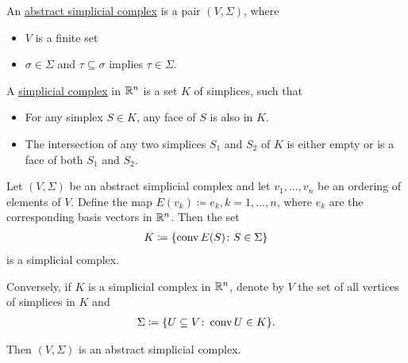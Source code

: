 \begin{definition}\label{def:abstract_simplicial_complex}\cite[definition 2.1]{Carlsson2009}
  An \uline{abstract simplicial complex} is a pair $(V, \Sigma)$, where
  \begin{itemize}
    \item $V$ is a finite set
    \item $\sigma \in \Sigma$ and $\tau \subseteq \sigma$ implies $\tau \in \Sigma$.
  \end{itemize}
\end{definition}

\begin{definition}\label{def:simplicial_complex}
  A \uline{simplicial complex} in $\mathbb R^n$ is a set $K$ of simplices, such that
  \begin{itemize}
    \item For any simplex $S \in K$, any face of $S$ is also in $K$.
    \item The intersection of any two simplices $S_1$ and $S_2$ of $K$ is either empty or is a face of both $S_1$ and $S_2$.
  \end{itemize}
\end{definition}

\begin{proposition}\label{thm:abstract_simplicial_complex_iff_simplicial_complex}
  Let $(V, \Sigma)$ be an abstract simplicial complex and let $v_1, \ldots, v_n$ be an ordering of elements of $V$. Define the map $E(v_k) \coloneqq e_k, k = 1, \ldots, n$, where $e_k$ are the corresponding basis vectors in $\mathbb R^n$. Then the set
  \begin{align*}
    K \coloneqq \{ \operatorname{conv} E(S) \colon S \in \Sigma \}
  \end{align*}
  is a simplicial complex.

  Conversely, if $K$ is a simplicial complex in $\mathbb R^n$, denote by $V$ the set of all vertices of simplices in $K$ and
  \begin{align*}
    \Sigma \coloneqq \{ U \subseteq V \colon \operatorname{conv} U \in K \}.
  \end{align*}

  Then $(V, \Sigma)$ is an abstract simplicial complex.
\end{proposition}
